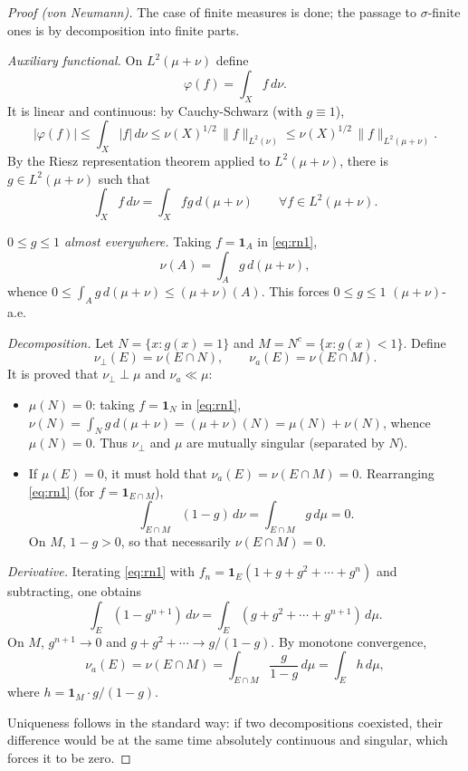 \documentclass[11pt, a4paper]{article}
\begin{document}
\begin{proof}[Proof (von Neumann)]
The case of finite measures is done; the passage to $\sigma$-finite ones is by decomposition into finite
parts.

\textit{Auxiliary functional.} On $L^2(\mu + \nu)$ define
$$ \varphi(f) = \int_X f \, d\nu. $$
It is linear and continuous: by Cauchy-Schwarz (with $g \equiv 1$),
$$ |\varphi(f)| \le \int_X |f| \, d\nu \le \nu(X)^{1/2} \, \|f\|_{L^2(\nu)} \le \nu(X)^{1/2} \,
\|f\|_{L^2(\mu+\nu)}. $$
By the Riesz representation theorem applied to $L^2(\mu + \nu)$, there is $g \in
L^2(\mu + \nu)$ such that
\begin{equation}\label{eq:rn1}
\int_X f \, d\nu = \int_X f g \, d(\mu + \nu) \qquad \forall f \in L^2(\mu + \nu).
\end{equation}

\textit{$0 \le g \le 1$ almost everywhere.} Taking $f = \mathbf{1}_A$ in \eqref{eq:rn1},
$$ \nu(A) = \int_A g \, d(\mu + \nu), $$
whence $0 \le \int_A g \, d(\mu + \nu) \le (\mu + \nu)(A)$. This forces $0 \le g \le 1$
$(\mu + \nu)$-a.e.

\textit{Decomposition.} Let $N = \{x : g(x) = 1\}$ and $M = N^c = \{x : g(x) < 1\}$. Define
$$ \nu_\perp(E) = \nu(E \cap N), \qquad \nu_a(E) = \nu(E \cap M). $$
It is proved that $\nu_\perp \perp \mu$ and $\nu_a \ll \mu$:
\begin{itemize}
    \item $\mu(N) = 0$: taking $f = \mathbf{1}_N$ in \eqref{eq:rn1},
    $\nu(N) = \int_N g \, d(\mu+\nu)
    = (\mu+\nu)(N) = \mu(N) + \nu(N)$, whence $\mu(N) = 0$. Thus $\nu_\perp$ and $\mu$ are
    mutually singular (separated by $N$).
    \item If $\mu(E) = 0$, it must hold that $\nu_a(E) = \nu(E \cap M) = 0$. Rearranging \eqref{eq:rn1}
    (for $f = \mathbf{1}_{E \cap M}$),
    $$ \int_{E \cap M} (1 - g) \, d\nu = \int_{E \cap M} g \, d\mu = 0. $$
    On $M$, $1 - g > 0$, so that necessarily $\nu(E \cap M) = 0$.
\end{itemize}

\textit{Derivative.} Iterating \eqref{eq:rn1} with $f_n = \mathbf{1}_E (1 + g + g^2 + \cdots + g^n)$ and
subtracting, one obtains
$$ \int_E (1 - g^{n+1}) \, d\nu = \int_E (g + g^2 + \cdots + g^{n+1}) \, d\mu. $$
On $M$, $g^{n+1} \to 0$ and $g + g^2 + \cdots \to g/(1-g)$. By monotone convergence,
$$ \nu_a(E) = \nu(E \cap M) = \int_{E \cap M} \frac{g}{1 - g} \, d\mu = \int_E h \, d\mu, $$
where $h = \mathbf{1}_M \cdot g/(1 - g)$.

Uniqueness follows in the standard way: if two decompositions coexisted, their difference would be at the same time
absolutely continuous and singular, which forces it to be zero.
\end{proof}
\end{document}
